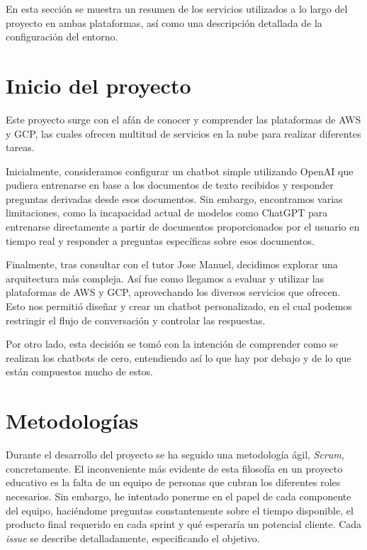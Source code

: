 En esta sección se muestra un resumen de los servicios utilizados a lo largo del proyecto en ambas plataformas, así como una descripción detallada de la configuración del entorno. 

\section{Inicio del proyecto}\label{inicio-del-proyecto}
Este proyecto surge con el afán de conocer y comprender las plataformas de AWS y GCP, las cuales ofrecen multitud de servicios en la nube para realizar diferentes tareas. 

Inicialmente, consideramos configurar un chatbot simple utilizando OpenAI que pudiera entrenarse en base a los documentos de texto recibidos y responder preguntas derivadas desde esos documentos.  Sin embargo, encontramos varias limitaciones, como la incapacidad actual de modelos como ChatGPT para entrenarse directamente a partir de documentos proporcionados por el usuario en tiempo real y responder a preguntas específicas sobre esos documentos. 

Finalmente, tras consultar con el tutor Jose Manuel, decidimos explorar una arquitectura más compleja. Así fue como llegamos a evaluar y utilizar las plataformas de AWS y GCP, aprovechando los diversos servicios que ofrecen. Esto nos permitió diseñar y crear un chatbot personalizado, en el cual podemos restringir el flujo de conversación y controlar las respuestas.

Por otro lado, esta decisión se tomó con la intención de comprender como se realizan los chatbots de cero, entendiendo así lo que hay por debajo y de lo que están compuestos mucho de estos.

\section{Metodologías}\label{Metodologías}
Durante el desarrollo del proyecto se ha seguido una metodología ágil, \textit{Scrum}, concretamente. El  inconveniente más evidente de esta filosofía en un proyecto educativo es la falta de un equipo de personas que cubran los diferentes roles necesarios. Sin embargo, he intentado ponerme en el papel de cada componente del equipo, haciéndome preguntas constantemente sobre el tiempo disponible, el producto final requerido en cada sprint y qué esperaría un potencial cliente. Cada \textit{issue} se describe detalladamente, especificando el objetivo.  

